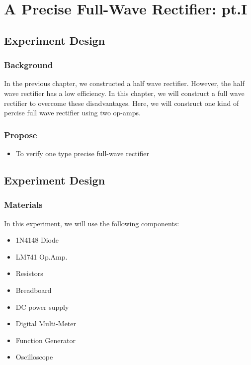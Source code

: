 \setcounter{section}{12}
\section{A Precise Full-Wave Rectifier: pt.I}

\subsection{Experiment Design}
    \subsubsection{Background}
        In the previous chapter, we constructed a half wave rectifier. However, the half wave rectifier has a low efficiency. In this chapter, we will construct a full wave rectifier to overcome these disadvantages. Here, we will construct one kind of percise full wave rectifier using two op-amps.

    \subsubsection{Propose}
    \begin{itemize}
        \item To verify one type precise full-wave rectifier
    \end{itemize}

\subsection{Experiment Design}
    \subsubsection{Materials}
        In this experiment, we will use the following components:
        \begin{itemize}
            \item 1N4148 Diode
            \item LM741 Op.Amp.
            \item Resistors
            \item Breadboard
            \item DC power supply
            \item Digital Multi-Meter
            \item Function Generator
            \item Oscilloscope
        \end{itemize}

